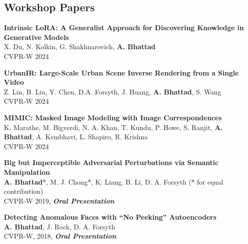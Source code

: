 \documentclass[margin,line]{res}
\begin{document}
\begin{resume}
\section{\sc \large Workshop Papers}
\renewcommand*{\labelenumi}{\theenumi.}
\begin{etaremune}[start=5, leftmargin=15pt]
\item {\bf {Intrinsic LoRA: A Generalist Approach for Discovering Knowledge in Generative Models}} \\{X. Du, N. Kolkin, G. Shakhnarovich, {\bf A. Bhattad}} \\
CVPR-W 2024
\item {\bf {UrbanIR: Large-Scale Urban Scene Inverse Rendering from a Single Video}}\\
{Z. Lin, B. Liu, Y. Chen, D.A. Forsyth, J. Huang, {\bf A. Bhattad}, S. Wang}\\
CVPR-W 2024
\item {\bf MIMIC: Masked Image Modeling with Image Correspondences
}\\
{{K. Marathe, M. Bigverdi, N. A. Khan, T. Kundu, P. Howe,
S. Ranjit, {\bf A. Bhattad}, A. Kembhavi, L. Shapiro, R. Krishna}}\\
CVPR-W 2024
\item {\bf Big but Imperceptible Adversarial Perturbations via Semantic Manipulation}\\
{{\bf A. Bhattad}*, M. J. Chong*, K. Liang, B. Li, D. A. Forsyth} \hfill{(* for equal contribution)} \\
CVPR-W 2019, {\bf \emph{Oral Presentation}} 
\item {\bf Detecting Anomalous Faces with ``No Peeking'' Autoencoders}\\
{{\bf A. Bhattad}, J. Rock, D. A. Forsyth}\\ 
{CVPR-W, 2018, {\bf \emph {Oral Presentation}}}
\end{etaremune}


\end{resume}
\end{document}
